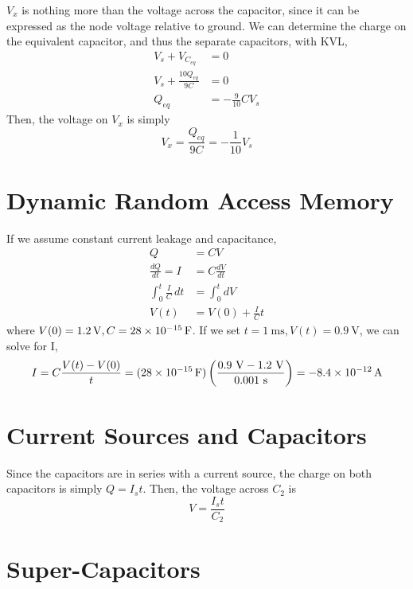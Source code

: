 \documentclass[]{article}
\begin{document}
\(V_x\) is nothing more than the voltage across the capacitor, since it can be expressed as the node voltage relative to ground. 
We can determine the charge on the equivalent capacitor, and thus the separate capacitors, with KVL, 
\begin{align}
	V_s + V_{C_{eq}} &= 0 \\
	V_s + \frac{10 Q_{eq}}{9 C} &= 0 \\
	Q_{eq} &= -\frac{9}{10}C V_s
\end{align}
Then, the voltage on \(V_x\) is simply
\begin{equation}
	V_x = \frac{Q_{eq}}{9C} = -\frac{1}{10}V_s
\end{equation}

\section{Dynamic Random Access Memory}

If we assume constant current leakage and capacitance, 
\begin{align}
	Q &= CV \\
	\frac{dQ}{dt} = I &= C \frac{dV}{dt} \\
	\int_{0}^{t} \frac{I}{C} \, dt &= \int_{0}^{t} dV \\
	V(t) &= V(0) + \frac{I}{C} t
\end{align}
where \(V(0) = \SI{1.2}{\volt}, C = \SI{28d-15}{\farad}\). 
If we set \(t = \SI{1}{\milli\second}, V(t) = \SI{0.9}{\volt}\), we can solve for I, 
\begin{equation}
	I = C \frac{V(t) - V(0)}{t} = (\SI{28d-15}{\farad}) \left(\frac{0.9 \ \si{\volt} - 1.2 \ \si{\volt}}{0.001 \ \si{\second}}\right) = \SI{-8.4d-12}{\ampere}
\end{equation}

\section{Current Sources and Capacitors}

Since the capacitors are in series with a current source, the charge on both capacitors is simply \(Q = I_s t\). 
Then, the voltage across \(C_2\) is 
\begin{equation}
	V = \frac{I_s t}{C_2}
\end{equation}

\section{Super-Capacitors}
\end{document}
